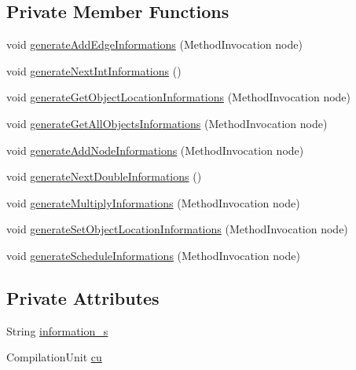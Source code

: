 \subsection*{Private Member Functions}
\begin{DoxyCompactItemize}
\item 
void \hyperlink{classit_1_1isislab_1_1masonhelperdocumentation_1_1visitor_1_1_start_method_visitor_af17c1a78f8f3ae828a9f539c7e53143b}{generate\-Add\-Edge\-Informations} (Method\-Invocation node)
\item 
void \hyperlink{classit_1_1isislab_1_1masonhelperdocumentation_1_1visitor_1_1_start_method_visitor_a97299094dabab3853b7c217b9d251e70}{generate\-Next\-Int\-Informations} ()
\item 
void \hyperlink{classit_1_1isislab_1_1masonhelperdocumentation_1_1visitor_1_1_start_method_visitor_a6b99e9cd0aad1042fb318d546c51c04c}{generate\-Get\-Object\-Location\-Informations} (Method\-Invocation node)
\item 
void \hyperlink{classit_1_1isislab_1_1masonhelperdocumentation_1_1visitor_1_1_start_method_visitor_a50c1310c51f4e9950e5133c9cd4a3e6c}{generate\-Get\-All\-Objects\-Informations} (Method\-Invocation node)
\item 
void \hyperlink{classit_1_1isislab_1_1masonhelperdocumentation_1_1visitor_1_1_start_method_visitor_ad982e1712d02c4c26aeb54a6d45391e7}{generate\-Add\-Node\-Informations} (Method\-Invocation node)
\item 
void \hyperlink{classit_1_1isislab_1_1masonhelperdocumentation_1_1visitor_1_1_start_method_visitor_aca8c74b759d1c226b983a5fb2264c49e}{generate\-Next\-Double\-Informations} ()
\item 
void \hyperlink{classit_1_1isislab_1_1masonhelperdocumentation_1_1visitor_1_1_start_method_visitor_a32bf5cec17ee25b26220130c026393e5}{generate\-Multiply\-Informations} (Method\-Invocation node)
\item 
void \hyperlink{classit_1_1isislab_1_1masonhelperdocumentation_1_1visitor_1_1_start_method_visitor_a09299758d8f3ce54b04db73271dde0da}{generate\-Set\-Object\-Location\-Informations} (Method\-Invocation node)
\item 
void \hyperlink{classit_1_1isislab_1_1masonhelperdocumentation_1_1visitor_1_1_start_method_visitor_a0961ec6f09ea3a15c8d97240d4703eb2}{generate\-Schedule\-Informations} (Method\-Invocation node)
\end{DoxyCompactItemize}
\subsection*{Private Attributes}
\begin{DoxyCompactItemize}
\item 
String \hyperlink{classit_1_1isislab_1_1masonhelperdocumentation_1_1visitor_1_1_start_method_visitor_a59b86134adb11f995ce96c1a96b51d50}{information\-\_\-s}
\item 
Compilation\-Unit \hyperlink{classit_1_1isislab_1_1masonhelperdocumentation_1_1visitor_1_1_start_method_visitor_a4111ccaff10a4938df4ff668149e92ad}{cu}
\end{DoxyCompactItemize}
